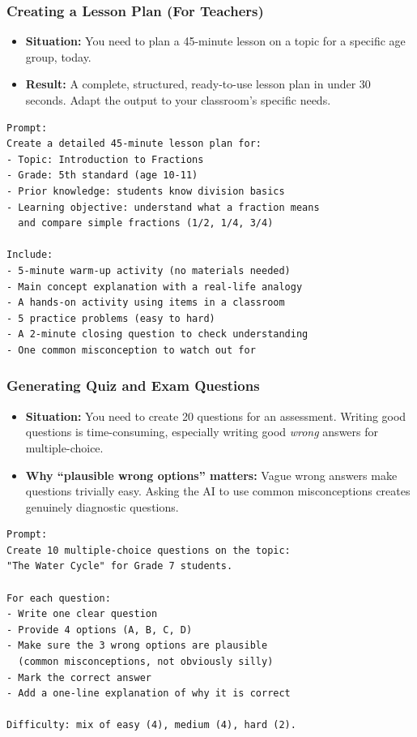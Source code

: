 \begin{frame}[fragile]\frametitle{Creating a Lesson Plan (For Teachers)}

    \begin{itemize}
        \item \textbf{Situation:} You need to plan a 45-minute lesson on a topic for a specific age group, today.
        \item \textbf{Result:} A complete, structured, ready-to-use lesson plan in under 30 seconds. Adapt the output to your classroom's specific needs.
    \end{itemize}
		
\begin{lstlisting}[language=HTML]
Prompt:
Create a detailed 45-minute lesson plan for:
- Topic: Introduction to Fractions
- Grade: 5th standard (age 10-11)
- Prior knowledge: students know division basics
- Learning objective: understand what a fraction means 
  and compare simple fractions (1/2, 1/4, 3/4)

Include:
- 5-minute warm-up activity (no materials needed)
- Main concept explanation with a real-life analogy
- A hands-on activity using items in a classroom
- 5 practice problems (easy to hard)
- A 2-minute closing question to check understanding
- One common misconception to watch out for
\end{lstlisting}



\end{frame}


\begin{frame}[fragile]\frametitle{Generating Quiz and Exam Questions}

    \begin{itemize}
        \item \textbf{Situation:} You need to create 20 questions for an assessment. Writing good questions is time-consuming, especially writing good \emph{wrong} answers for multiple-choice.
        \item \textbf{Why ``plausible wrong options'' matters:} Vague wrong answers make questions trivially easy. Asking the AI to use common misconceptions creates genuinely diagnostic questions.
    \end{itemize}
		
\begin{lstlisting}[language=HTML]
Prompt:
Create 10 multiple-choice questions on the topic: 
"The Water Cycle" for Grade 7 students.

For each question:
- Write one clear question
- Provide 4 options (A, B, C, D)
- Make sure the 3 wrong options are plausible 
  (common misconceptions, not obviously silly)
- Mark the correct answer
- Add a one-line explanation of why it is correct

Difficulty: mix of easy (4), medium (4), hard (2).
\end{lstlisting}



\end{frame}


